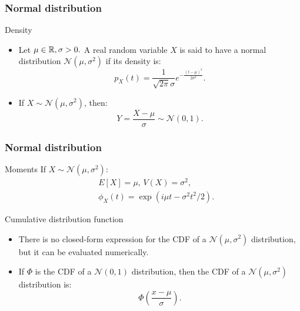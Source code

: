 \documentclass[main.tex]{subfiles}
\begin{document}
\begin{frame}
    \frametitle{Normal distribution}
\begin{block}{Density}
    \begin{itemize}
        \item<+-> Let $\mu \in \mathbb{R}, \sigma > 0.$ A real random variable $X$
        is said to have a normal distribution $\mathcal{N}(\mu,\sigma^2)$ if its
        density is:
        \begin{equation}
            p_X(t)=\frac{1}{\sqrt{2 \pi}\sigma}e^{-\frac{(t-\mu)^2}{2 \sigma^2}}.
        \end{equation}
        \item<+-> If $X \sim \mathcal{N}(\mu,\sigma^2)$, then:
        \begin{equation}
            Y = \frac{X-\mu}{\sigma} \sim \mathcal{N}(0,1).
        \end{equation}
    \end{itemize}
\end{block}
\end{frame}
\begin{frame}
    \frametitle{Normal distribution}
\begin{block}{Moments}
    If $X\sim \mathcal{N}\left(\mu, \sigma^2\right):$
    \begin{equation}
        \begin{split}
            &E\left[ X \right] = \mu, \, V\left( X \right) = \sigma^2,\\
            & \phi_X(t)= \exp\left( i \mu t - \sigma^2 t^2 / 2 \right).
        \end{split}
    \end{equation}
\end{block}
\begin{block}{Cumulative distribution function}
    \begin{itemize}
        \item<+-> There is no closed-form expression for the CDF of 
        a $\mathcal{N}(\mu, \sigma^2)$ distribution, but it can be evaluated
        numerically.
        \item<+-> If $\Phi$ is the CDF of a $\mathcal{N}(0,1)$ distribution,
        then the CDF of a $\mathcal{N}(\mu,\sigma^2)$ distribution is:
        \begin{equation}
            \Phi \left( \frac{x-\mu}{\sigma} \right).
        \end{equation}
    \end{itemize}
\end{block}    
\end{frame}
\end{document}
